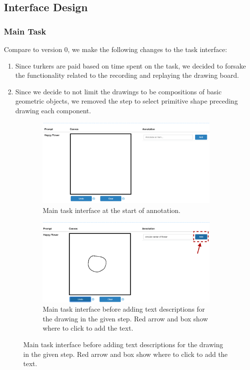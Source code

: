 \subsection{Interface Design}

\subsubsection{Main Task}
Compare to version 0, we make the following changes to the task interface: 
\begin{enumerate}
    \item Since turkers are paid based on time spent on the task, we decided to forsake the functionality related to the recording and replaying the drawing board.
    \item Since we decide to not limit the drawings to be compositions of basic geometric objects, we removed the step to select primitive shape preceding drawing each component.
\end{enumerate}

\begin{figure}[!htb]
\begin{subfigure}{\textwidth}
    \centering
    \includegraphics[width=.8\linewidth]{data_collection/v1_empty_table.png}  
    \caption{Main task interface at the start of annotation.}
    \label{v1.main_task.1.a}
\end{subfigure}
\newline
\begin{subfigure}{\textwidth}
    \centering
    \includegraphics[width=.8\linewidth]{data_collection/v1_before_enter_text.png}  
    \caption{Main task interface before adding text descriptions for the drawing in the given step. Red arrow and box show where to click to add the text.}
    \label{v1.main_task.1.b}
\end{subfigure}
\end{figure}


